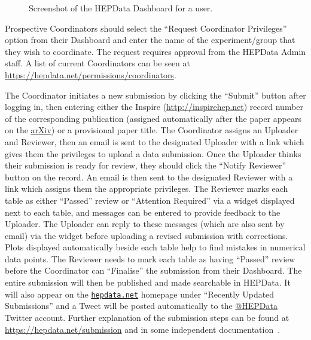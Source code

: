 \documentclass[a4paper]{jpconf}
\begin{document}
\begin{figure}
  \begin{center}
  \end{center}
  \caption{\label{fig:dashboard}Screenshot of the HEPData Dashboard for a user.}
\end{figure}
%
Prospective Coordinators should select the ``Request Coordinator Privileges''
option from their Dashboard and enter the name of the experiment/group that
they wish to coordinate.  The request requires approval from the HEPData Admin
staff.  A list of current Coordinators can be seen at
\url{https://hepdata.net/permissions/coordinators}.

The Coordinator initiates a new submission by clicking the ``Submit'' button
after logging in, then entering either the Inspire
(\url{http://inspirehep.net}) record number of the corresponding publication
(assigned automatically after the paper appears on the
\href{https://arxiv.org/}{arXiv}) or a provisional paper title.  The
Coordinator assigns an Uploader and Reviewer, then an email is sent to the
designated Uploader with a link which gives them the privileges to upload a
data submission.  Once the Uploader thinks their submission is ready for
review, they should click the ``Notify Reviewer'' button on the record.  An
email is then sent to the designated Reviewer with a link which assigns them
the appropriate privileges.  The Reviewer marks each table as either
``Passed'' review or ``Attention Required'' via a widget displayed next to each
table, and messages can be entered to provide feedback to the Uploader.  The
Uploader can reply to these messages (which are also sent by email) via the
widget before uploading a revised submission with corrections.  Plots displayed
automatically beside each table help to find mistakes in numerical data points.
 The Reviewer needs to mark each table as having ``Passed'' review before the
Coordinator can ``Finalise'' the submission from their Dashboard.  The entire
submission will then be published and made searchable in HEPData.  It will also
appear on the \href{https://www.hepdata.net}{\texttt{hepdata.net}} homepage
under ``Recently Updated Submissions'' and a Tweet will be posted automatically
to the \href{https://twitter.com/HEPData}{@HEPData} Twitter account.  Further
explanation of the submission steps can be found at
\url{https://hepdata.net/submission} and in some independent
documentation~\cite{matteo_bonanomi_2016_197109}.
\end{document}
